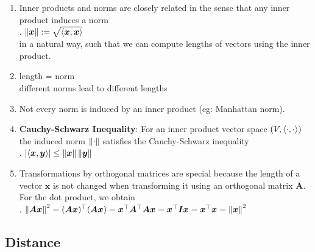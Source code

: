 \begin{enumerate}
    \item Inner products and norms are closely related in the sense that any inner product induces a norm
    \hfill \cite{mfml/book/mml/Deisenroth-Faisal-Ong}
    \\
    .\hfill
    $\left\| \bm{x} \right\| := \sqrt{\langle\bm{x}, \bm{x}\rangle}$
    \hfill \cite{mfml/book/mml/Deisenroth-Faisal-Ong}
    \\
    in a natural way, such that we can compute lengths of vectors using the inner product.
    \hfill \cite{mfml/book/mml/Deisenroth-Faisal-Ong}

    \item length = norm
    \hfill \cite{common/online/chatgpt}
    \\
    different norms lead to different lengths
    \hfill \cite{common/online/chatgpt}

    \item Not every norm is induced by an inner product (eg: Manhattan norm).
    \hfill \cite{mfml/book/mml/Deisenroth-Faisal-Ong}

    \item \textbf{Cauchy-Schwarz Inequality}: For an inner product vector space $(V,\langle\cdot, \cdot\rangle)$ the induced norm $\left\| \cdot \right\|$ satisfies the Cauchy-Schwarz inequality
    \hfill \cite{mfml/book/mml/Deisenroth-Faisal-Ong}
    \\
    .\hfill
    $\left| \langle\bm{x}, \bm{y}\rangle \right| \leq \left\| \bm{x} \right\| \left\| \bm{y} \right\|$
    \hfill \cite{mfml/book/mml/Deisenroth-Faisal-Ong}

    \item Transformations by orthogonal matrices are special because the length of a vector $\bm{x}$ is not changed when transforming it using an orthogonal matrix $\bm{A}$. 
    For the dot product, we obtain
    \hfill \cite{mfml/book/mml/Deisenroth-Faisal-Ong}
    \\
    .\hfill
    $
        \left\| \bm{Ax} \right\|^2 
        = (\bm{Ax})^\top (\bm{Ax})
        = \bm{x}^\top \bm{A}^\top \bm{Ax}
        = \bm{x}^\top \bm{Ix}
        = \bm{x}^\top \bm{x}
        = \left\| \bm{x} \right\|^2
    $
    \hfill \cite{mfml/book/mml/Deisenroth-Faisal-Ong}
\end{enumerate}





\subsection{Distance}

